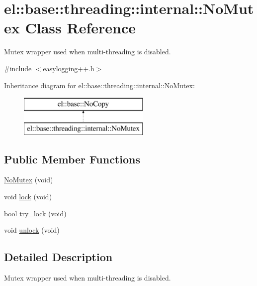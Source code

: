 \hypertarget{classel_1_1base_1_1threading_1_1internal_1_1_no_mutex}{}\section{el\+:\+:base\+:\+:threading\+:\+:internal\+:\+:No\+Mutex Class Reference}
\label{classel_1_1base_1_1threading_1_1internal_1_1_no_mutex}


Mutex wrapper used when multi-\/threading is disabled.  




{\ttfamily \#include $<$easylogging++.\+h$>$}

Inheritance diagram for el\+:\+:base\+:\+:threading\+:\+:internal\+:\+:No\+Mutex\+:\begin{figure}[H]
\begin{center}
\leavevmode
\includegraphics[height=2.000000cm]{classel_1_1base_1_1threading_1_1internal_1_1_no_mutex}
\end{center}
\end{figure}
\subsection*{Public Member Functions}
\begin{DoxyCompactItemize}
\item 
\hyperlink{classel_1_1base_1_1threading_1_1internal_1_1_no_mutex_a23985cbf635efacb39f2a789d539bd29}{No\+Mutex} (void)
\item 
void \hyperlink{classel_1_1base_1_1threading_1_1internal_1_1_no_mutex_a3b38e4e9411c924daa70d358cf561b3c}{lock} (void)
\item 
bool \hyperlink{classel_1_1base_1_1threading_1_1internal_1_1_no_mutex_a4c0c35a99cf41f26a7608fed5609d6ae}{try\+\_\+lock} (void)
\item 
void \hyperlink{classel_1_1base_1_1threading_1_1internal_1_1_no_mutex_a5a248c97fee2ef0087526f2f8d3cd26e}{unlock} (void)
\end{DoxyCompactItemize}


\subsection{Detailed Description}
Mutex wrapper used when multi-\/threading is disabled. 

